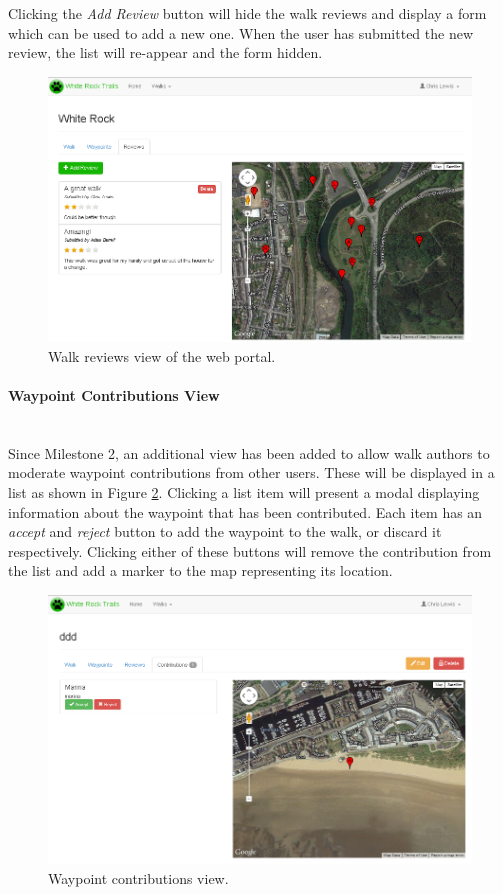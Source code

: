 \documentclass[11pt,a4paper]{report}
\begin{document}
Clicking the \emph{Add Review} button will hide the walk reviews and display a form which can be used to add a new one. When the user has submitted the new review, the list will re-appear and the form hidden.

\begin{figure}[H]
\centering
\includegraphics[width=1\linewidth]{./img/webportal/walk-reviews}
\caption{Walk reviews view of the web portal.}
\label{fig:walk-reviews}
\end{figure}

\paragraph{Waypoint Contributions View}\mbox{}\\
Since Milestone 2, an additional view has been added to allow walk authors to moderate waypoint contributions from other users. These will be displayed in a list as shown in Figure \ref{fig:waypoint-contributions}. Clicking a list item will present a modal displaying information about the waypoint that has been contributed. Each item has an \emph{accept} and \emph{reject} button to add the waypoint to the walk, or discard it respectively. Clicking either of these buttons will remove the contribution from the list and add a marker to the map representing its location.

\begin{figure}[H]
\centering
\includegraphics[width=1\linewidth]{./img/webportal/waypoint-contributions}
\caption{Waypoint contributions view.}
\label{fig:waypoint-contributions}
\end{figure}
\end{document}
